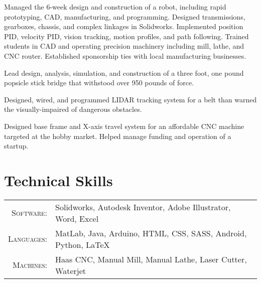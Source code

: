 \documentclass{my_cv}
\begin{document}
Managed the 6-week design and construction of a robot, including rapid prototyping, CAD, manufacturing, and programming. Designed transmissions, gearboxes, chassis, and complex linkages in Solidworks. Implemented position PID, velocity PID, vision tracking, motion profiles, and path following. Trained students in CAD and operating precision machinery including mill, lathe, and CNC router. Established sponsorship ties with local manufacturing businesses.

Lead design, analysis, simulation, and construction of a three foot, one pound popsicle stick bridge that withstood over 950 pounds of force.



Designed, wired, and programmed LIDAR tracking system for a belt than warned the visually-impaired of dangerous obstacles.

Designed base frame and X-axis travel system for an affordable CNC machine targeted at the hobby market. Helped manage funding and operation of a startup.

\section{Technical Skills}
\begin{tabular}{rl}
  \textsc{Software:}   & Solidworks, Autodesk Inventor, Adobe Illustrator, Word, Excel\\
  \textsc{Languages:}  & MatLab, Java, Arduino, HTML, CSS, SASS, Android, Python, \LaTeX\\
  \textsc{Machines:}   & Haas CNC, Manual Mill, Manual Lathe, Laser Cutter, Waterjet\\
\end{tabular}
\end{document}
